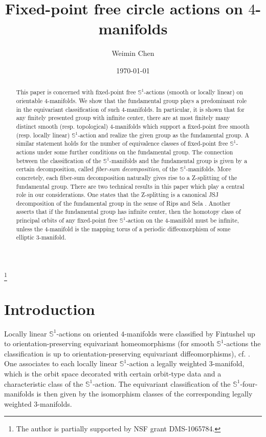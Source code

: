 \documentclass[11pt]{amsart}
\theoremstyle{plain}
\numberwithin{theorem}{section}
\theoremstyle{definition}
\begin{document}
\title{Fixed-point free circle actions on $4$-manifolds}
\author{Weimin Chen}
\keywords{}
\thanks{The author is partially supported by NSF grant DMS-1065784.}
\date{\today}
\maketitle

\begin{abstract}
This paper is concerned with fixed-point free ${{\mathbb S}}^1$-actions (smooth or locally linear) on
orientable $4$-manifolds. We show that the fundamental group plays a predominant role in the
equivariant classification of such $4$-manifolds. In particular, it is shown that for any finitely 
presented group with infinite center, there are at most finitely many distinct smooth (resp.
topological) $4$-manifolds which support a fixed-point free smooth (resp. locally linear)
${{\mathbb S}}^1$-action and realize the given group as the fundamental group. A similar statement 
holds for the number of equivalence classes of fixed-point free ${{\mathbb S}}^1$-actions under some 
further conditions on the fundamental group. The connection between the classification 
of the ${{\mathbb S}}^1$-manifolds and the fundamental group is given by a certain decomposition, 
called {\it fiber-sum decomposition}, of the ${{\mathbb S}}^1$-manifolds. More concretely, each fiber-sum 
decomposition naturally gives rise to a Z-splitting of the fundamental group. There are two 
technical results in this paper which play a central role in our considerations. One states that 
the Z-splitting is a canonical JSJ decomposition of the fundamental group in the sense of 
Rips and Sela \cite{RipS}. Another asserts that if the fundamental group has infinite center, 
then the homotopy class of principal orbits of any fixed-point free ${{\mathbb S}}^1$-action on the 
$4$-manifold must be infinite, unless the $4$-manifold is the mapping torus of a periodic 
diffeomorphism of some elliptic $3$-manifold.
\end{abstract}

\section{Introduction}

Locally linear ${{\mathbb S}}^1$-actions on oriented $4$-manifolds were classified by Fintushel up to 
orientation-preserving equivariant homeomorphisms (for smooth ${{\mathbb S}}^1$-actions the classification 
is up to orientation-preserving equivariant diffeomorphisms), cf. \cite{F0,F1,F2}. 
One associates to each locally linear ${{\mathbb S}}^1$-action a legally weighted $3$-manifold, which is the 
orbit space decorated with certain orbit-type data and a characteristic class of the ${{\mathbb S}}^1$-action. 
The equivariant classification of the ${{\mathbb S}}^1$-four-manifolds is then given by the isomorphism classes 
of the corresponding legally weighted $3$-manifolds. 
\end{document}
